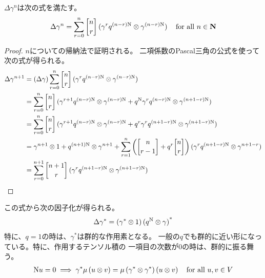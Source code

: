 {	$\Delta\gamma^n$は次の式を満たす。
	\begin{equation*}\begin{split}
		\Delta\gamma^n = \sum_{r=0}^n\qbinom{n}{r}
			\plr{\gamma^rq^{\plr{n-r}\opN}\otimes\gamma^{\plr{n-r}\opN}} 
			\quad\text{for all } n\in\sizen
	\end{split}\end{equation*}
	\begin{proof} %
		$n$についての帰納法で証明される。
		二項係数のPascal三角の公式を使って次の式が得られる。
		\begin{equation*}\begin{split}
			\Delta\gamma^{n+1} &= \plr{\Delta\gamma}
				\sum_{r=0}^n\qbinom{n}{r}\plr{\gamma^rq^{\plr{n-r}\opN}
				\otimes\gamma^{\plr{n-r}\opN}} \\
			&= \sum_{r=0}^n\qbinom{n}{r}\plr{\gamma^{r+1}q^{\plr{n-r}\opN}
				\otimes\gamma^{\plr{n-r}\opN} + q^{\opN}\gamma^rq^{\plr{n-r}\opN}
				\otimes\gamma^{\plr{n+1-r}\opN}} \\
			&= \sum_{r=0}^n\qbinom{n}{r}\plr{\gamma^{r+1}q^{\plr{n-r}\opN}
				\otimes\gamma^{\plr{n-r}\opN} + q^r\gamma^rq^{\plr{n+1-r}\opN}
				\otimes\gamma^{\plr{n+1-r}\opN}} \\
			&= \gamma^{n+1}\otimes1 + q^{\plr{n+1}\opN}\otimes\gamma^{n+1}
				+ \sum_{r=1}^n\plra{\qbinom{n}{r-1} + q^r\qbinom{n}{r}}
				\plr{\gamma^rq^{\plr{n+1-r}\opN}\otimes\gamma^{n+1-r}} \\
			&= \sum_{r=0}^{n+1}\qbinom{n+1}{r}\plr{\gamma^rq^{\plr{n+1-r}\opN}
				\otimes\gamma^{\plr{n+1-r}\opN}}
		\end{split}\end{equation*}
	\end{proof} %
	この式から次の因子化が得られる。
	\begin{equation*}\begin{split}
		\Delta\gamma^* = \mathinner{({\gamma^*\otimes1})}\mathinner{({q^{\mathinner{\operatorname{N}}}\otimes\gamma})}^*
	\end{split}\end{equation*}
	特に、$q=1$の時は、$\gamma^*$は群的な作用素となる。
	一般の$q$でも群的に近い形になっている。特に、作用するテンソル積の
	一項目の次数が$0$の時は、群的に振る舞う。
	\begin{equation*}\begin{split}
		{\mathinner{\operatorname{N}}} u = 0 \implies \gamma^*\mu\mathinner{({u\otimes v})}
		= \mu\mathinner{({\gamma^*\otimes\gamma^*})}\mathinner{({u\otimes v})}
		\quad\text{for all } u,v\in V
	\end{split}\end{equation*}

}
